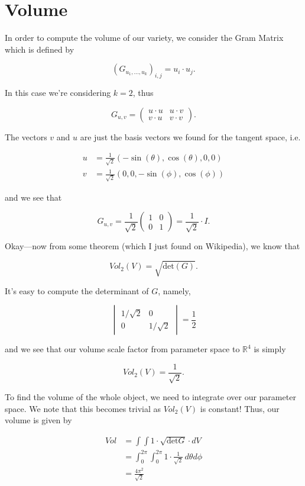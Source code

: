 \documentclass{article}
\newcommand{\be}{\begin{equation}}
\newcommand{\ee}{\end{equation}}
\newcommand{\pmm}{\begin{pmatrix}}
\newcommand{\epm}{\end{pmatrix}}
\newcommand{\bvm}{\begin{vmatrix}}
\newcommand{\evm}{\end{vmatrix}}
\newcommand{\real}{\mathbb{R}}
\newcommand{\Det}{\textrm{det}}
\newcommand{\mbf}{}
\begin{document}
\section*{Volume}

In order to compute the volume of our variety, we consider the Gram Matrix which is defined by 

\be
	(G_{\mbf{u}_1, ... , \mbf{u}_k})_{i, j} = \mbf{u}_i \cdot \mbf{u}_j. 
\ee

In this case we're considering $k = 2$, thus

\be
	G_{\mbf{u}, \mbf{v}} = \pmm \mbf{u} \cdot \mbf{u} & \mbf{u} \cdot \mbf{v} \\ \mbf{v} \cdot \mbf{u} & \mbf{v} \cdot \mbf{v} \epm. 
\ee

The vectors $\mbf{v}$ and $\mbf{u}$ are just the basis vectors we found for the tangent space, i.e.

\be
\begin{split}
	\mbf{u} & = \frac{1}{\sqrt{2}}(-\sin(\theta), \cos(\theta), 0, 0) \\
	\mbf{v} & = \frac{1}{\sqrt{2}}(0, 0, -\sin(\phi), \cos(\phi))
\end{split}
\ee

and we see that 

\be
	G_{\mbf{u}, \mbf{v}} = \frac{1}{\sqrt{2}} \pmm 1 & 0 \\ 0 & 1 \epm = \frac{1}{\sqrt{2}} \cdot \mbf{I}. 
\ee

Okay---now from some theorem (which I just found on Wikipedia), we know that 

\be
	Vol_2(V) = \sqrt{\Det(G)}. 
\ee

It's easy to compute the determinant of $G$, namely, 

\be
 \bvm 1/\sqrt{2} & 0 \\ 0 & 1/\sqrt{2} \evm = \frac{1}{2}
\ee

and we see that our volume scale factor from parameter space to $\real^4$ is simply

\be
	Vol_2(V) = \frac{1}{\sqrt{2}}.
\ee

To find the volume of the whole object, we need to integrate over our parameter space. We note that this becomes trivial as $Vol_2(V)$ is constant! Thus, our volume is given by

\be
\begin{split}
	Vol & = \int \!\! \int 1 \cdot \sqrt{\Det G} \cdot dV \\
	& = \int_0^{2\pi} \!\!\!\! \int_0^{2\pi} 1 \cdot \frac{1}{\sqrt{2}} \, d\theta d\phi \\
	& \boxed{ = \frac{4 \pi^2}{\sqrt{2}}}
\end{split}
\ee
\end{document}
